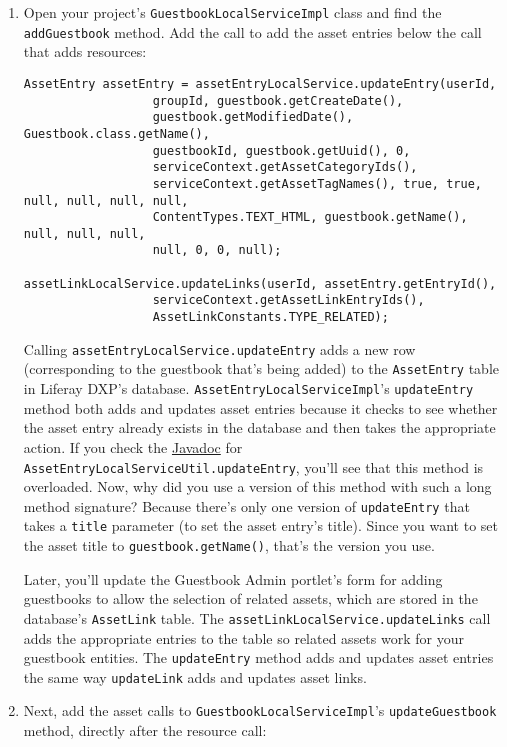 \begin{enumerate}
\def\labelenumi{\arabic{enumi}.}
\item
  Open your project's \texttt{GuestbookLocalServiceImpl} class and find
  the \texttt{addGuestbook} method. Add the call to add the asset
  entries below the call that adds resources:

\begin{verbatim}
AssetEntry assetEntry = assetEntryLocalService.updateEntry(userId,
                  groupId, guestbook.getCreateDate(),
                  guestbook.getModifiedDate(), Guestbook.class.getName(),
                  guestbookId, guestbook.getUuid(), 0,
                  serviceContext.getAssetCategoryIds(),
                  serviceContext.getAssetTagNames(), true, true, null, null, null, null,
                  ContentTypes.TEXT_HTML, guestbook.getName(), null, null, null,
                  null, 0, 0, null);

assetLinkLocalService.updateLinks(userId, assetEntry.getEntryId(),
                  serviceContext.getAssetLinkEntryIds(),
                  AssetLinkConstants.TYPE_RELATED);
\end{verbatim}

  Calling \texttt{assetEntryLocalService.updateEntry} adds a new row
  (corresponding to the guestbook that's being added) to the
  \texttt{AssetEntry} table in Liferay DXP's database.
  \texttt{AssetEntryLocalServiceImpl}'s \texttt{updateEntry} method both
  adds and updates asset entries because it checks to see whether the
  asset entry already exists in the database and then takes the
  appropriate action. If you check the
  \href{https://docs.liferay.com/dxp/portal/7.2-latest/javadocs/portal-impl/com/liferay/portlet/asset/service/impl/AssetEntryLocalServiceImpl.html}{Javadoc}
  for \texttt{AssetEntryLocalServiceUtil.updateEntry}, you'll see that
  this method is overloaded. Now, why did you use a version of this
  method with such a long method signature? Because there's only one
  version of \texttt{updateEntry} that takes a \texttt{title} parameter
  (to set the asset entry's title). Since you want to set the asset
  title to \texttt{guestbook.getName()}, that's the version you use.

  Later, you'll update the Guestbook Admin portlet's form for adding
  guestbooks to allow the selection of related assets, which are stored
  in the database's \texttt{AssetLink} table. The
  \texttt{assetLinkLocalService.updateLinks} call adds the appropriate
  entries to the table so related assets work for your guestbook
  entities. The \texttt{updateEntry} method adds and updates asset
  entries the same way \texttt{updateLink} adds and updates asset links.
\item
  Next, add the asset calls to \texttt{GuestbookLocalServiceImpl}'s
  \texttt{updateGuestbook} method, directly after the resource call:


\end{enumerate}
